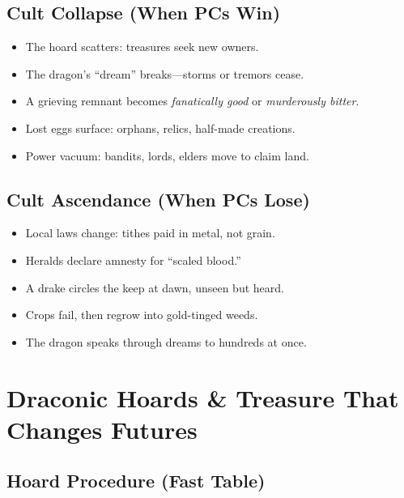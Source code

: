 \documentclass[11pt,letterpaper]{article}
\begin{document}
\subsection{Cult Collapse (When PCs Win)}

\begin{itemize}[leftmargin=*]
\item The hoard scatters: treasures seek new owners.
\item The dragon's ``dream'' breaks---storms or tremors cease.
\item A grieving remnant becomes \textit{fanatically good} or \textit{murderously bitter}.
\item Lost eggs surface: orphans, relics, half-made creations.
\item Power vacuum: bandits, lords, elders move to claim land.
\end{itemize}

\subsection{Cult Ascendance (When PCs Lose)}

\begin{itemize}[leftmargin=*]
\item Local laws change: tithes paid in metal, not grain.
\item Heralds declare amnesty for ``scaled blood.''
\item A drake circles the keep at dawn, unseen but heard.
\item Crops fail, then regrow into gold-tinged weeds.
\item The dragon speaks through dreams to hundreds at once.
\end{itemize}

\section{Draconic Hoards \& Treasure That Changes Futures}


\subsection{Hoard Procedure (Fast Table)}
\end{document}

